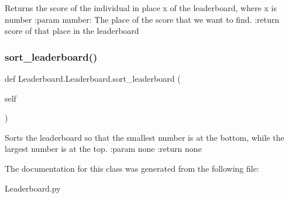 \begin{DoxyVerb}Returns the score of the individual in place x of the leaderboard, where x is number
:param number: The place of the score that we want to find.
:return score of that place in the leaderboard
\end{DoxyVerb}
 \mbox{\label{class_leaderboard_1_1_leaderboard_a5d275657e02abc778198a8c4aa6f4304}} 
\subsubsection{\texorpdfstring{sort\+\_\+leaderboard()}{sort\_leaderboard()}}
{\footnotesize\ttfamily def Leaderboard.\+Leaderboard.\+sort\+\_\+leaderboard (\begin{DoxyParamCaption}\item[{}]{self }\end{DoxyParamCaption})}

\begin{DoxyVerb}Sorts the leaderboard so that the smallest number is at the bottom, while the largest number is at the top.
:param none
:return none
\end{DoxyVerb}
 

The documentation for this class was generated from the following file\+:\begin{DoxyCompactItemize}
\item 
Leaderboard.\+py\end{DoxyCompactItemize}
